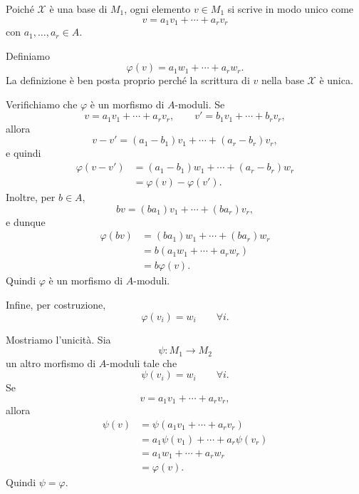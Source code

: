 \documentclass[a4paper]{article}
\begin{document}
\begin{radioactive}
\begin{snippetproof}{}
    Poiché \(\mathcal{X}\) è una base di \(M_1\), ogni elemento \(v\in M_1\) si scrive in modo unico come
    \[
        v=a_1v_1+\cdots+a_rv_r
    \]
    con \(a_1,\ldots,a_r\in A\).

    Definiamo
    \[
        \varphi(v)
        =
        a_1w_1+\cdots+a_rw_r.
    \]
    La definizione è ben posta proprio perché la scrittura di \(v\) nella base \(\mathcal{X}\) è unica.

    Verifichiamo che \(\varphi\) è un morfismo di \(A\)-moduli. Se
    \[
        v=a_1v_1+\cdots+a_rv_r,
        \qquad
        v'=b_1v_1+\cdots+b_rv_r,
    \]
    allora
    \[
        v-v'=(a_1-b_1)v_1+\cdots+(a_r-b_r)v_r,
    \]
    e quindi
    \begin{align*}
        \varphi(v-v')
        &=
        (a_1-b_1)w_1+\cdots+(a_r-b_r)w_r \\
        &=
        \varphi(v)-\varphi(v').
    \end{align*}
    Inoltre, per \(b\in A\),
    \[
        bv=(ba_1)v_1+\cdots+(ba_r)v_r,
    \]
    e dunque
    \begin{align*}
        \varphi(bv)
        &=
        (ba_1)w_1+\cdots+(ba_r)w_r \\
        &=
        b(a_1w_1+\cdots+a_rw_r) \\
        &=
        b\varphi(v).
    \end{align*}
    Quindi \(\varphi\) è un morfismo di \(A\)-moduli.

    Infine, per costruzione,
    \[
        \varphi(v_i)=w_i
        \qquad
        \forall i.
    \]

    Mostriamo l'unicità. Sia
    \[
        \psi\colon M_1\to M_2
    \]
    un altro morfismo di \(A\)-moduli tale che
    \[
        \psi(v_i)=w_i
        \qquad
        \forall i.
    \]
    Se
    \[
        v=a_1v_1+\cdots+a_rv_r,
    \]
    allora
    \begin{align*}
        \psi(v)
        &=
        \psi(a_1v_1+\cdots+a_rv_r) \\
        &=
        a_1\psi(v_1)+\cdots+a_r\psi(v_r) \\
        &=
        a_1w_1+\cdots+a_rw_r \\
        &=
        \varphi(v).
    \end{align*}
    Quindi \(\psi=\varphi\).
\end{snippetproof}
\end{radioactive}
\end{document}
